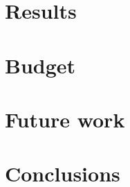 \documentclass{etsist_pfg}
\begin{document}
\chapter{Results}


\chapter{Budget}


\chapter{Future work}


\chapter{Conclusions}


\printbibliography
\end{document}
